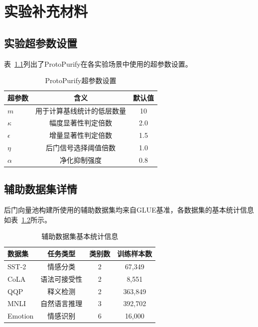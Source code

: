 
\appendix

\chapter{实验补充材料}

\section{实验超参数设置}

表~\ref{tab:hyperparams}列出了ProtoPurify在各实验场景中使用的超参数设置。

\begin{table}[htbp]
    \centering
    \caption{ProtoPurify超参数设置}
    \label{tab:hyperparams}
    \begin{tabular}{lcc}
        \toprule
        超参数 & 含义 & 默认值 \\
        \midrule
        $m$ & 用于计算基线统计的低层数量 & 10 \\
        $\kappa$ & 幅度显著性判定倍数 & 2.0 \\
        $\epsilon$ & 增量显著性判定倍数 & 1.5 \\
        $\eta$ & 后门信号选择阈值倍数 & 1.0 \\
        $\alpha$ & 净化抑制强度 & 0.8 \\
        \bottomrule
    \end{tabular}
\end{table}

\section{辅助数据集详情}

后门向量池构建所使用的辅助数据集均来自GLUE基准，各数据集的基本统计信息如表~\ref{tab:auxdata}所示。

\begin{table}[htbp]
    \centering
    \caption{辅助数据集基本统计信息}
    \label{tab:auxdata}
    \begin{tabular}{lccc}
        \toprule
        数据集 & 任务类型 & 类别数 & 训练样本数 \\
        \midrule
        SST-2   & 情感分类 & 2 & 67,349 \\
        CoLA    & 语法可接受性 & 2 & 8,551 \\
        QQP     & 释义检测 & 2 & 363,849 \\
        MNLI    & 自然语言推理 & 3 & 392,702 \\
        Emotion & 情感识别 & 6 & 16,000 \\
        \bottomrule
    \end{tabular}
\end{table}
